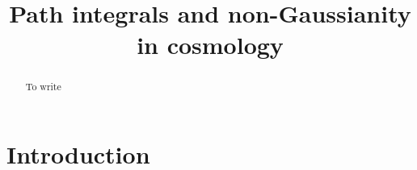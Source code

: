\documentclass[11pt]{article}
\title{Path integrals and non-Gaussianity in cosmology}
\begin{document}
\maketitle
\tableofcontents

\begin{abstract}
    To write
\end{abstract}

\section{Introduction}





\printbibliography
\end{document}
